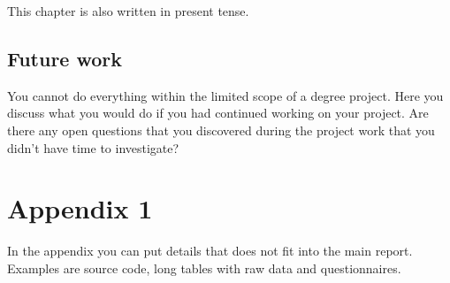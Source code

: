 \documentclass[a4paper,12pt]{article}
\begin{document}
This chapter is also written in present tense.

\subsection{Future work}
You cannot do everything within the limited scope of a degree project. Here you discuss what you would do if you had continued working on your project. Are there any open questions that you discovered during the project work that you didn't have time to investigate?

\newpage


%
\newpage

\hypersetup{urlcolor=black}


\newpage
\setcounter{page}{1} %
\appendix

\section{Appendix 1} 
In the appendix you can put details that does not fit into the main report. Examples are source code, long tables with raw data and questionnaires.
\end{document}

